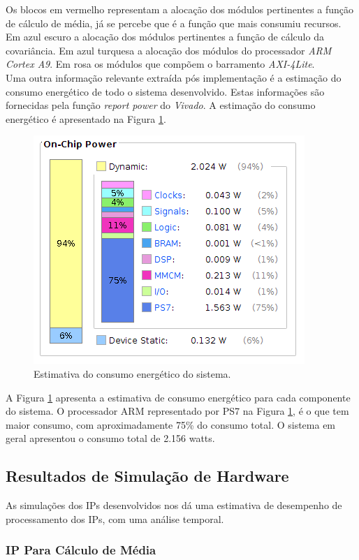Os blocos em vermelho representam a alocação dos módulos pertinentes a função de cálculo de média, já se percebe que é a função que mais consumiu recursos. Em azul escuro a alocação dos módulos pertinentes a função de cálculo da covariância. Em azul turquesa a alocação dos módulos do processador \textit{ARM Cortex A9}. 
Em rosa os módulos que compõem o barramento \textit{AXI-4Lite}.\\
Uma outra informação relevante extraída pós implementação é a estimação do consumo energético de todo o sistema desenvolvido. Estas informações são fornecidas pela função \textit{report power} do \textit{Vivado}. A estimação do consumo energético é apresentado na Figura \ref{power}.
\begin{figure}[!h]
	\centering
	\includegraphics[keepaspectratio=true,scale=0.5]{figuras/power.png}
	\caption{Estimativa do consumo energético do sistema.}
	\label{power}
\end{figure}

A Figura \ref{power} apresenta a estimativa de consumo energético para cada componente do sistema. O processador ARM representado por PS7 na Figura \ref{power}, é o que tem maior consumo, com aproximadamente 75\% do consumo total. O sistema em geral apresentou o consumo total de 2.156 watts.
 

\subsection{Resultados de Simulação de Hardware}
As simulações dos IPs desenvolvidos nos dá uma estimativa de desempenho de processamento dos IPs, com uma análise temporal. 

\subsubsection{IP Para Cálculo de Média}

